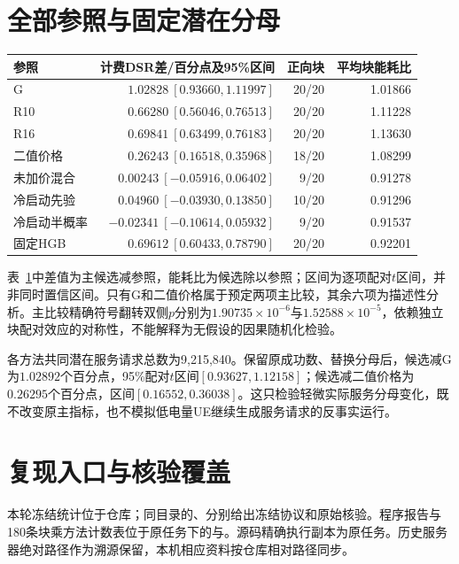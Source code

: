 \section{全部参照与固定潜在分母}
\begin{table}[!htbp]
\centering
{}
\label{tab:cost-all-contrasts}
\small
\begin{tabular}{lrrr}
\toprule
参照 & 计费DSR差/百分点及95\%区间 & 正向块 & 平均块能耗比\\
\midrule
G & $1.02828\ [0.93660,1.11997]$ & 20/20 & 1.01866\\
R10 & $0.66280\ [0.56046,0.76513]$ & 20/20 & 1.11228\\
R16 & $0.69841\ [0.63499,0.76183]$ & 20/20 & 1.13630\\
二值价格 & $0.26243\ [0.16518,0.35968]$ & 18/20 & 1.08299\\
未加价混合 & $0.00243\ [-0.05916,0.06402]$ & 9/20 & 0.91278\\
冷启动先验 & $0.04960\ [-0.03930,0.13850]$ & 10/20 & 0.91296\\
冷启动半概率 & $-0.02341\ [-0.10614,0.05932]$ & 9/20 & 0.91537\\
固定HGB & $0.69612\ [0.60433,0.78790]$ & 20/20 & 0.92201\\
\bottomrule
\end{tabular}
\end{table}
表~\ref{tab:cost-all-contrasts}中差值为主候选减参照，能耗比为候选除以参照；区间为逐项配对$t$区间，并非同时置信区间。只有G和二值价格属于预定两项主比较，其余六项为描述性分析。主比较精确符号翻转双侧$p$分别为$1.90735\times10^{-6}$与$1.52588\times10^{-5}$，依赖独立块配对效应的对称性，不能解释为无假设的因果随机化检验。

各方法共同潜在服务请求总数为9,215,840。保留原成功数、替换分母后，候选减G为$1.02892$个百分点，95\%配对$t$区间$[0.93627,1.12158]$；候选减二值价格为$0.26295$个百分点，区间$[0.16552,0.36038]$。这只检验轻微实际服务分母变化，既不改变原主指标，也不模拟低电量UE继续生成服务请求的反事实运行。

\section{复现入口与核验覆盖}
本轮冻结统计位于仓库\allowbreak{}；同目录的、分别给出冻结协议和原始核验。程序报告与180条块乘方法计数表位于原任务下的与。源码精确执行副本为原任务。历史服务器绝对路径作为溯源保留，本机相应资料按仓库相对路径同步。

